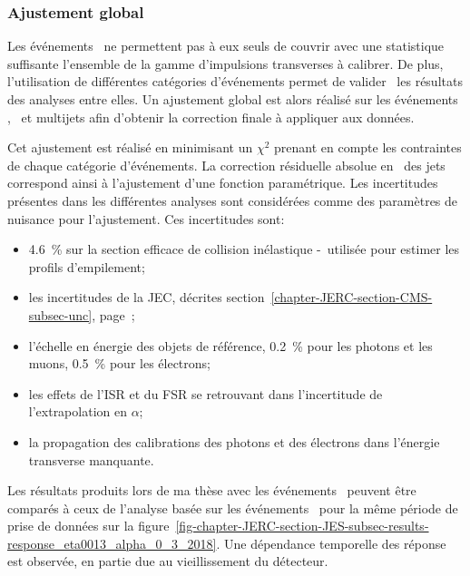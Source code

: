 \subsubsection{Ajustement global}\label{chapter-JERC-section-JES-subsec-results-subsubsec-global_fit}
Les événements \Gjets\ ne permettent pas à eux seuls de couvrir avec une statistique suffisante l'ensemble de la gamme d'impulsions transverses à calibrer.
De plus, l'utilisation de différentes catégories d'événements permet de valider \aposteriori\ les résultats des analyses entre elles.
Un ajustement global est alors réalisé sur les événements \Zjets, \Gjets\ et multijets afin d'obtenir la correction finale à appliquer aux données.
\par Cet ajustement est réalisé en minimisant un $\chi^2$ prenant en compte les contraintes de chaque catégorie d'événements.
La correction résiduelle absolue en \pT\ des jets correspond ainsi à l'ajustement d'une fonction paramétrique.
Les incertitudes présentes dans les différentes analyses sont considérées comme des paramètres de nuisance pour l'ajustement. Ces incertitudes sont:
\begin{itemize}
\item \SI{4.6}{\%} sur la section efficace de collision inélastique \proton-\proton\ utilisée pour estimer les profils d'empilement;
\item les incertitudes de la JEC, décrites section~\ref{chapter-JERC-section-CMS-subsec-unc}, page~\pageref{chapter-JERC-section-CMS-subsec-unc};
\item l'échelle en énergie des objets de référence, \SI{0.2}{\%} pour les photons et les muons, \SI{0.5}{\%} pour les électrons;
\item les effets de l'ISR et du FSR se retrouvant dans l'incertitude de l'extrapolation en $\alpha$;
\item la propagation des calibrations des photons et des électrons dans l'énergie transverse manquante.
\end{itemize}
\par Les résultats produits lors de ma thèse avec les événements \Gjets\ peuvent être comparés à ceux de l'analyse basée sur les événements \Zmmjets\ pour la même période de prise de données sur la figure~\ref{fig-chapter-JERC-section-JES-subsec-results-response_eta0013_alpha_0_3_2018}.
Une dépendance temporelle des réponse est observée, en partie due au vieillissement du détecteur.
